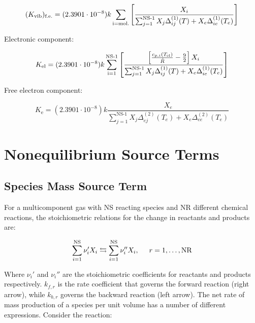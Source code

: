 \documentclass[10pt]{article}
\begin{document}
\begin{flushleft}
\begin{definition}
    \begin{equation}
        (K_\text{vib})_\text{f.e.} = (2.3901 \cdot 10^{-8})k \sum_\text{i=mol.} \left[ \frac{X_i}{\sum_{j=1}^\text{NS-1}X_j \Delta_{ij}^{(1)}(T) + X_e \Delta_{ie}^{(1)}(T_e)} \right]
    \end{equation}

    Electronic component:

    \begin{equation}
        K_\text{el} = (2.3901 \cdot 10^{-8})k \sum_\text{i=1}^\text{NS-1} \left[ \frac{\left[ \frac{c_{p,i}(T_\text{el})}{\hat{R}} - \frac{9}{2} \right] X_i}{\sum_{j=1}^\text{NS-1}X_j \Delta_{ij}^{(1)}(T) + X_e \Delta_{ie}^{(1)}(T_e)} \right]
    \end{equation}

    Free electron component:

    \begin{equation}
        K_\text{e} = (2.3901 \cdot 10^{-8})k \frac{X_e}{\sum_{j=1}^\text{NS-1}X_j \Delta_{ej}^{(2)}(T_e) + X_e \Delta_{ee}^{(2)}(T_e)}
    \end{equation}




\end{definition}



\newpage

\newpage

\section{Nonequilibrium Source Terms}

\subsection{Species Mass Source Term}
\label{sec:chem_source}


For a multicomponent gas with NS reacting species and NR different chemical reactions, the stoichiometric relations for the change in reactants and products are:

\begin{equation}
    \sum_{i=1}^\text{NS} \nu_i' X_i \leftrightarrows \sum_{i=1}^\text{NS} \nu_i'' X_i, 
    \hspace{5mm} r=1, \dots , \text{NR}
\end{equation}

Where $\nu_i'$ and $\nu_i''$ are the stoichiometric coefficients for reactants and products respectively. $k_{f,r}$ is the rate coefficient that governs the forward reaction (right arrow), while $k_{b,r}$ governs the backward reaction (left arrow). The net rate of mass production of a species per unit volume has a number of different expressions. Consider the reaction:


\end{flushleft}
\end{document}
